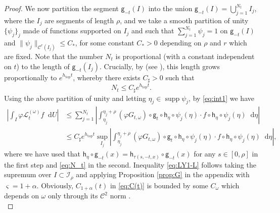 \documentclass[11pt,letterpaper]{amsart}
\newcommand \cI {{\mathcal I}}
\newcommand \cL {{\mathcal L}}
\newcommand \cC {{\mathscr{C}}}
\newcommand \sC {{C_\sharp}}
\newcommand{\horo}{\mathsf{h}}
\newcommand{\geo}{\mathsf{g}}
\newcommand*{\diff}{\mathop{}\!\mathrm{d}}
\DeclareMathOperator{\topp}{top}
\theoremstyle{definition}
\begin{document}
\begin{proof}
We now partition the segment $\geo_{-t}(I)$ into the union $\geo_{-t}(I)=\bigcup_{j=1}^{N_t} I_j$, where the $I_j$ are segments of length $\rho$, and we take a smooth partition of unity $\{\psi_j\}_j$ made of functions supported on $I_j$ and such that $\sum_{j=1}^{N_t} \psi_j=1$ on $\geo_{-t}(I)$ and $\|\psi_j\|_{\cC^r(I_j)}\le C_*$, for some constant $C_*>0$ depending on $\rho$ and $r$ which are fixed. Note that the number $N_t$ is proportional (with a constant independent on $t$) to the length of $\geo_{-t}(I_j)$. Crucially, by  (see \cite[Lemma C.3]{GiLiPo}), this length grows proportionally to $e^{h_{\topp}t}$, whereby there exists $\sC>0$ such that
\begin{equation}\label{eq:N_t}
N_t \le \sC e^{h_{\topp}t}.
\end{equation}
Using the above partition of unity and letting $\eta_j \in \operatorname{supp} \psi_j$, by \eqref{eq:int1} we have
\begin{equation}\label{eq:int2}
\begin{split}
\left|\int_I \varphi \cL^{(\omega)}_t f \diff  U \right| &\le
  \sum_{j=1}^{N_t}\left| \int_{\eta_j}^{\eta_j+\rho}  (\varphi G_{t,\omega})\circ \geo_t\circ \horo_\eta\circ \psi_j(\eta) \cdot f\circ \horo_\eta \circ \psi_j(\eta)\diff \eta \right|\\
 &\le \sC e^{h_{\topp}t}  \sup_{I_j}\left| \int_{\eta_j}^{\eta_j+\rho}  (\varphi G_{t,\omega})\circ \geo_t\circ \horo_\eta\circ \psi_j(\eta) \cdot f\circ \horo_\eta \circ \psi_j(\eta)\diff \eta \right|,
\end{split}
\end{equation}
where we have used that $\horo_\eta\circ \geo_{-t}(x)=\horo_{\tau(s,-t,x)}\circ \geo_{-t}(x)$ for any $s\in [0,\rho]$ in the first step and \eqref{eq:N_t} in the second. Inequality \eqref{eq:LY1-L} follows taking the supremum over $I\subset \cI_\rho$ and applying Proposition \ref{prop:G} in the appendix with $\varsigma=1+\alpha$. Obviously, $C_{1+\alpha}(t)$ in \eqref{eq:C(t)} is bounded by some $C_\omega$ which depends on $\omega$ only through its $\cC^2$ norm .\\






\end{proof}
\end{document}
